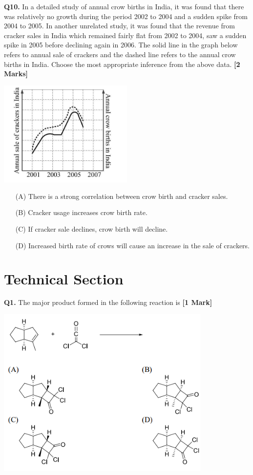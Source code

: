 \documentclass[11pt]{article}
\newcommand{\questiona}[2]{
    \noindent\textbf{Q#2.} #1 \hfill \textbf{[1 Mark]}
}
\newcommand{\questionb}[2]{
    \noindent\textbf{Q#2.} #1 \hfill \textbf{[2 Marks]}
}
\begin{document}
\questionb{In a detailed study of annual crow births in India, it was found that there was relatively no growth during the period 2002 to 2004 and a sudden spike from 2004 to 2005. In another unrelated study, it was found that the revenue from cracker sales in India which remained fairly flat from 2002 to 2004, saw a sudden spike in 2005 before declining again in 2006. The solid line in the graph below refers to annual sale of crackers and the dashed line refers to the annual crow births in India. Choose the most appropriate inference from the above data.}{10}
\begin{center}
\includegraphics[width=0.5\textwidth]{figures/10.png}
\end{center}
\begin{enumerate}
    \item[(A)] There is a strong correlation between crow birth and cracker sales.
    \item[(B)] Cracker usage increases crow birth rate.
    \item[(C)] If cracker sale declines, crow birth will decline.
    \item[(D)] Increased birth rate of crows will cause an increase in the sale of crackers.
\end{enumerate}
\vspace{0.5cm}

\section*{Technical Section}

\questiona{The major product formed in the following reaction is}{1}
\begin{center}
\includegraphics[width=0.8\textwidth]{figures/1}
\end{center}
\end{document}
